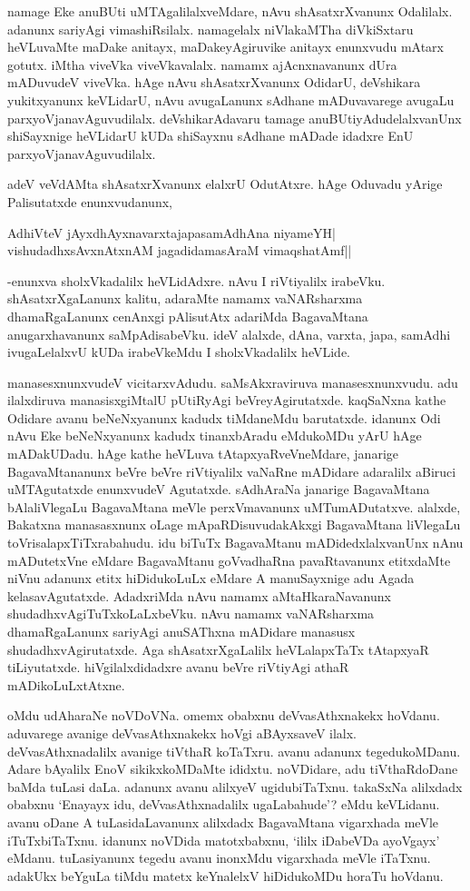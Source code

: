 namage Eke anuBUti uMTAgalilalxveMdare, nAvu shAsatxrXvanunx Odalilalx. adanunx sariyAgi vimashiRsilalx. namagelalx niVlakaMTha diVkiSxtaru heVLuvaMte maDake anitayx, maDakeyAgiruvike anitayx enunxvudu mAtarx gotutx. iMtha viveVka viveVkavalalx. namamx ajAcnxnavanunx dUra mADuvudeV viveVka. hAge nAvu shAsatxrXvanunx OdidarU, deVshikara yukitxyanunx keVLidarU, nAvu avugaLanunx sAdhane mADuvavarege avugaLu parxyoVjanavAguvudilalx. deVshikarAdavaru tamage anuBUtiyAdudelalxvanUnx shiSayxnige heVLidarU kUDa shiSayxnu sAdhane mADade idadxre EnU parxyoVjanavAguvudilalx.

adeV veVdAMta shAsatxrXvanunx elalxrU OdutAtxre. hAge Oduvadu yArige Palisutatxde enunxvudanunx,

\begin{shloka}
AdhiVteV jAyxdhAyxnavarxtajapasamAdhAna niyameYH|\\
vishudadhxsAvxnAtxnAM jagadidamasAraM vimaqshatAmf||
\end{shloka}

-enunxva sholxVkadalilx heVLidAdxre. nAvu I riVtiyalilx irabeVku. shAsatxrXgaLanunx kalitu, adaraMte namamx vaNARsharxma dhamaRgaLanunx cenAnxgi pAlisutAtx adariMda BagavaMtana anugarxhavanunx saMpAdisabeVku. ideV alalxde, dAna, varxta, japa, samAdhi ivugaLelalxvU kUDa irabeVkeMdu I sholxVkadalilx heVLide.

manasesxnunxvudeV vicitarxvAdudu. saMsAkxraviruva manasesxnunxvudu. adu ilalxdiruva manasisxgiMtalU pUtiRyAgi beVreyAgirutatxde. kaqSaNxna kathe Odidare avanu beNeNxyanunx kadudx tiMdaneMdu barutatxde. idanunx Odi nAvu Eke beNeNxyanunx kadudx tinanxbAradu eMdukoMDu yArU hAge mADakUDadu. hAge kathe heVLuva tAtapxyaRveVneMdare, janarige BagavaMtananunx beVre beVre riVtiyalilx vaNaRne mADidare adaralilx aBiruci uMTAgutatxde enunxvudeV Agutatxde. sAdhAraNa janarige BagavaMtana bAlaliVlegaLu BagavaMtana meVle perxVmavanunx uMTumADutatxve. alalxde, Bakatxna manasasxnunx oLage mApaRDisuvudakAkxgi BagavaMtana liVlegaLu toVrisalapxTiTxrabahudu. idu biTuTx BagavaMtanu mADidedxlalxvanUnx nAnu mADutetxVne eMdare BagavaMtanu goVvadhaRna pavaRtavanunx etitxdaMte niVnu adanunx etitx hiDidukoLuLx eMdare A manuSayxnige adu Agada kelasavAgutatxde. AdadxriMda nAvu namamx aMtaHkaraNavanunx shudadhxvAgiTuTxkoLaLxbeVku. nAvu namamx vaNARsharxma dhamaRgaLanunx sariyAgi anuSAThxna mADidare manasusx shudadhxvAgirutatxde. Aga shAsatxrXgaLalilx heVLalapxTaTx tAtapxyaR tiLiyutatxde. hiVgilalxdidadxre avanu beVre riVtiyAgi athaR mADikoLuLxtAtxne.

oMdu udAharaNe noVDoVNa. omemx obabxnu deVvasAthxnakekx hoVdanu. aduvarege avanige deVvasAthxnakekx hoVgi aBAyxsaveV ilalx. deVvasAthxnadalilx avanige tiVthaR koTaTxru. avanu adanunx tegedukoMDanu. Adare bAyalilx EnoV sikikxkoMDaMte ididxtu. noVDidare, adu tiVthaRdoDane baMda tuLasi daLa. adanunx avanu alilxyeV ugidubiTaTxnu. takaSxNa alilxdadx obabxnu `Enayayx idu, deVvasAthxnadalilx ugaLabahude'? eMdu keVLidanu. avanu oDane A tuLasidaLavanunx alilxdadx BagavaMtana vigarxhada meVle iTuTxbiTaTxnu. idanunx noVDida matotxbabxnu, `ililx iDabeVDa ayoVgayx' eMdanu. tuLasiyanunx tegedu avanu inonxMdu vigarxhada meVle iTaTxnu. adakUkx beYguLa tiMdu matetx keYnalelxV hiDidukoMDu horaTu hoVdanu.


